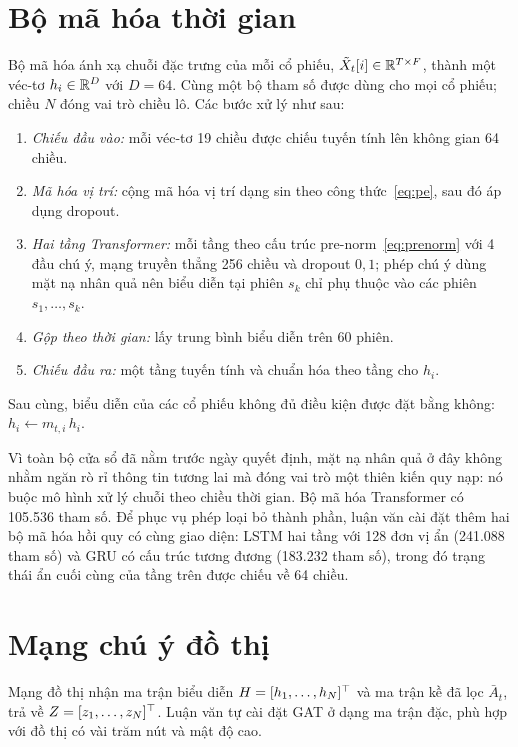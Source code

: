 \section{Bộ mã hóa thời gian}
\label{sec:encoder}

Bộ mã hóa ánh xạ chuỗi đặc trưng của mỗi cổ phiếu, $\tilde X_t[i]\in\mathbb{R}^{T\times F}$, thành một véc-tơ $h_i\in\mathbb{R}^{D}$ với $D=64$. Cùng một bộ tham số được dùng cho mọi cổ phiếu; chiều $N$ đóng vai trò chiều lô. Các bước xử lý như sau:
\begin{enumerate}[leftmargin=1.6cm]
  \item \textit{Chiếu đầu vào:} mỗi véc-tơ 19 chiều được chiếu tuyến tính lên không gian 64 chiều.
  \item \textit{Mã hóa vị trí:} cộng mã hóa vị trí dạng sin theo công thức~\eqref{eq:pe}, sau đó áp dụng dropout.
  \item \textit{Hai tầng Transformer:} mỗi tầng theo cấu trúc pre-norm~\eqref{eq:prenorm} với 4 đầu chú ý, mạng truyền thẳng 256 chiều và dropout $0{,}1$; phép chú ý dùng mặt nạ nhân quả nên biểu diễn tại phiên $s_k$ chỉ phụ thuộc vào các phiên $s_1,\dots,s_k$.
  \item \textit{Gộp theo thời gian:} lấy trung bình biểu diễn trên 60 phiên.
  \item \textit{Chiếu đầu ra:} một tầng tuyến tính và chuẩn hóa theo tầng cho $h_i$.
\end{enumerate}
Sau cùng, biểu diễn của các cổ phiếu không đủ điều kiện được đặt bằng không: $h_i\leftarrow m_{t,i}\,h_i$.

Vì toàn bộ cửa sổ đã nằm trước ngày quyết định, mặt nạ nhân quả ở đây không nhằm ngăn rò rỉ thông tin tương lai mà đóng vai trò một thiên kiến quy nạp: nó buộc mô hình xử lý chuỗi theo chiều thời gian. Bộ mã hóa Transformer có 105.536 tham số. Để phục vụ phép loại bỏ thành phần, luận văn cài đặt thêm hai bộ mã hóa hồi quy có cùng giao diện: LSTM hai tầng với 128 đơn vị ẩn (241.088 tham số) và GRU có cấu trúc tương đương (183.232 tham số), trong đó trạng thái ẩn cuối cùng của tầng trên được chiếu về 64 chiều.

\section{Mạng chú ý đồ thị}
\label{sec:gat}

Mạng đồ thị nhận ma trận biểu diễn $H=[h_1,\dots,h_N]^{\top}$ và ma trận kề đã lọc $\bar A_t$, trả về $Z=[z_1,\dots,z_N]^{\top}$. Luận văn tự cài đặt GAT ở dạng ma trận đặc, phù hợp với đồ thị có vài trăm nút và mật độ cao.

